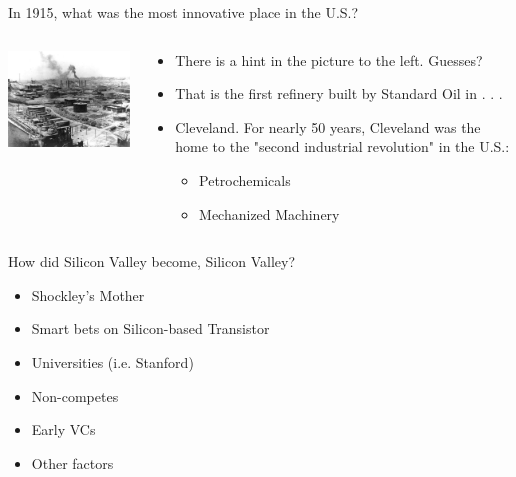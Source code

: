\documentclass{beamer}
\begin{document}
\begin{frame}{In 1915, what was the most innovative place in the U.S.?}
  \begin{columns}[T]
    \begin{column}{6cm}
    \includegraphics[width=6cm]{Standard_Oil.jpg}
    \end{column} 
    \begin{column}{.5\textwidth}
    \begin{itemize}
        \item{There is a hint in the picture to the left. Guesses?
        \pause
        }
        \item{
        That is the first refinery built by Standard Oil in . . . 
        \pause
        }
        \item{Cleveland. For nearly 50 years, Cleveland was the home to the "second industrial revolution" in the U.S.:
        \begin{itemize}
            \item{Petrochemicals}
            \item{Mechanized Machinery}
        \end{itemize}
        }
    \end{itemize}
    \end{column}
  \end{columns}
\end{frame}


\begin{frame}{How did Silicon Valley become, Silicon Valley?}
\pause
 \begin{itemize}
    \item{Shockley's Mother}
    \item{Smart bets on Silicon-based Transistor}
    \item{Universities (i.e. Stanford)}
    \item{Non-competes}
    \item{Early VCs}
    \item{Other factors}
\end{itemize}
\end{frame}
\end{document}
